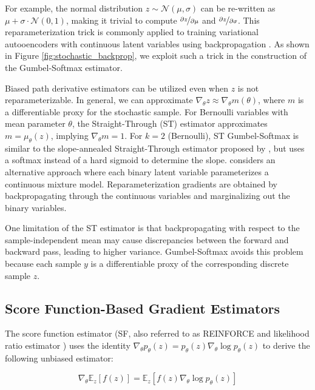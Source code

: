 \documentclass{article} %
\begin{document}
For example, the normal distribution $z \sim \mathcal{N}(\mu,\sigma)$ can be re-written as $\mu+\sigma \cdot \mathcal{N}(0,1)$, making it trivial to compute $\nicefrac{\partial z}{\partial \mu}$ and $\nicefrac{\partial z}{\partial \sigma}$. 
This reparameterization trick is commonly applied to training variational autooencoders with continuous latent variables using backpropagation \citep{kingma_vae,rezende2014}. As shown in Figure \ref{fig:stochastic_backprop}, we exploit such a trick in the construction of the Gumbel-Softmax estimator.

Biased path derivative estimators can be utilized even when $z$ is not reparameterizable. In general, we can approximate $\nabla_\theta z \approx \nabla_\theta m(\theta)$, where $m$ is a differentiable proxy for the stochastic sample. For Bernoulli variables with mean parameter $\theta$, the Straight-Through (ST) estimator \citep{DBLP:journals/corr/BengioLC13} approximates $m = \mu_\theta(z)$, implying $\nabla_\theta m = 1$. For $k=2$ (Bernoulli), ST Gumbel-Softmax is similar to the slope-annealed Straight-Through estimator proposed by \citet{HMRNN}, but uses a softmax instead of a hard sigmoid to determine the slope. \citet{Rolfe2016} considers an alternative approach where each binary latent variable parameterizes a continuous mixture model. Reparameterization gradients are obtained by backpropagating through the continuous variables and marginalizing out the binary variables.

One limitation of the ST estimator is that backpropagating with respect to the sample-independent mean may cause discrepancies between the forward and backward pass, leading to higher variance. Gumbel-Softmax avoids this problem because each sample $y$ is a differentiable proxy of the corresponding discrete sample $z$.

\subsection{Score Function-Based Gradient Estimators}

The score function estimator (SF, also referred to as REINFORCE \citep{Williams92simplestatistical} and likelihood ratio estimator \citep{LR}) uses the identity $\nabla_\theta p_\theta (z) = p_\theta (z) \nabla_\theta \log p_\theta (z)$ to derive the following unbiased estimator:

\begin{equation} \label{eq:sf}
\nabla_\theta \mathbb{E}_{z}\left[f(z)\right] = \mathbb{E}_z\left[f(z)\nabla_\theta \log p_\theta(z)\right]
\end{equation}
\end{document}
